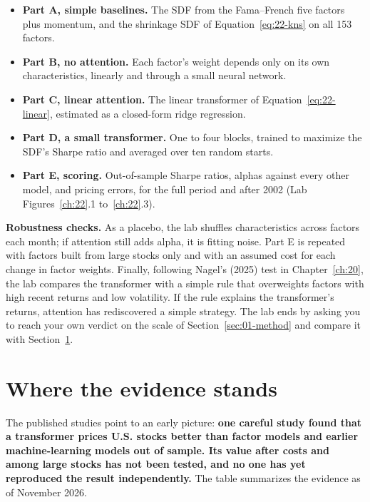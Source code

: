 \begin{itemize}
  \item \textbf{Part A, simple baselines.} The SDF from the Fama--French five factors plus momentum, and the shrinkage SDF of Equation~\eqref{eq:22-kns} on all 153 factors.
  \item \textbf{Part B, no attention.} Each factor's weight depends only on its own characteristics, linearly and through a small neural network.
  \item \textbf{Part C, linear attention.} The linear transformer of Equation~\eqref{eq:22-linear}, estimated as a closed-form ridge regression.
  \item \textbf{Part D, a small transformer.} One to four blocks, trained to maximize the SDF's Sharpe ratio and averaged over ten random starts.
  \item \textbf{Part E, scoring.} Out-of-sample Sharpe ratios, alphas against every other model, and pricing errors, for the full period and after 2002 (Lab Figures~\ref{ch:22}.1 to~\ref{ch:22}.3).
\end{itemize}


\label{sec:22-stress}
\textbf{Robustness checks.} As a placebo, the lab shuffles characteristics across factors each month; if attention still adds alpha, it is fitting noise. Part E is repeated with factors built from large stocks only and with an assumed cost for each change in factor weights. Finally, following Nagel's (2025) test in Chapter~\ref{ch:20}, the lab compares the transformer with a simple rule that overweights factors with high recent returns and low volatility. If the rule explains the transformer's returns, attention has rediscovered a simple strategy. The lab ends by asking you to reach your own verdict on the scale of Section~\ref{sec:01-method} and compare it with Section~\ref{sec:22-verdict}.

\section{Where the evidence stands}
\label{sec:22-verdict}

The published studies point to an early picture: \textbf{one careful study found that a transformer prices U.S. stocks better than factor models and earlier machine-learning models out of sample. Its value after costs and among large stocks has not been tested, and no one has yet reproduced the result independently.} The table summarizes the evidence as of November 2026.

